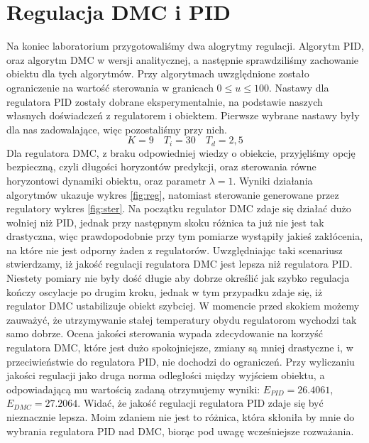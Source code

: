 \chapter{Regulacja DMC i PID}
Na koniec laboratorium przygotowaliśmy dwa alogrytmy regulacji. Algorytm PID,
oraz algorytm DMC w wersji analitycznej, a następnie sprawdziliśmy
zachowanie obiektu dla tych algorytmów. Przy algorytmach uwzględnione
zostało ograniczenie na wartość sterowania w granicach $0 \leq u \leq 100$.
Nastawy dla regulatora PID zostały dobrane eksperymentalnie, na podstawie
naszych własnych doświadczeń z regulatorem i obiektem. Pierwsze wybrane
nastawy były dla nas zadowalające, więc pozostaliśmy przy nich.
\begin{equation}
  K = 9 \quad T_i = 30 \quad T_d = 2,5
\end{equation}
Dla regulatora DMC, z braku odpowiedniej wiedzy o obiekcie,
przyjęliśmy opcję bezpieczną, czyli długości horyzontów predykcji,
oraz sterowania równe horyzontowi dynamiki obiektu, oraz parametr $\lambda = 1$.
Wyniki działania algorytmów ukazuje wykres \ref{fig:reg}, natomiast sterowanie
generowane przez regulatory wykres \ref{fig:ster}. Na początku regulator
DMC zdaje się działać dużo wolniej niż PID, jednak przy następnym skoku
różnica ta już nie jest tak drastyczna, więc prawdopodobnie przy tym pomiarze
wystąpiły jakieś zakłócenia, na które nie jest odporny żaden z regulatorów.
Uwzględniając taki scenariusz stwierdzamy, iż jakość regulacji regulatora
DMC jest lepsza niż regulatora PID. Niestety pomiary nie były dość długie aby
dobrze określić jak szybko regulacja kończy oscylacje po drugim kroku, jednak
w tym przypadku zdaje się, iż regulator DMC ustabilizuje obiekt szybciej.
W momencie przed skokiem możemy zauważyć, że utrzymywanie stałej temperatury
obydu regulatorom wychodzi tak samo dobrze. Ocena jakości sterowania wypada
zdecydowanie na korzyść regulatora DMC, które jest dużo spokojniejsze, zmiany
są mniej drastyczne i, w przeciwieństwie do regulatora PID, nie dochodzi do
ograniczeń. Przy wyliczaniu jakości regulacji jako druga norma odległości
między wyjściem obiektu, a odpowiadającą mu wartością zadaną otrzymujemy
wyniki: $E_{PID} = 26.4061$, $E_{DMC} = 27.2064$. Widać, że jakość regulacji
regulatora PID zdaje się być nieznacznie lepsza. Moim zdaniem nie jest to
różnica, która skłoniła by mnie do wybrania regulatora PID nad DMC, biorąc
pod uwagę wcześniejsze rozważania.

